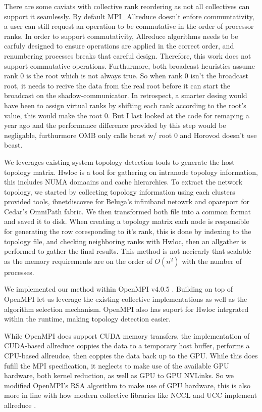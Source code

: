 There are some caviats with collective rank reordering as not all collectives can support it seamlessly.
By default MPI\_Allreduce doesn't enfore communtativity, a user can still request an operation to be commutative in the order of processor ranks. 
In order to support commutativity, Allreduce algorithms needs to be carfuly designed to ensure operations are applied in the correct order, and renumbering processes breaks that careful design.
Therefore, this work does not support commutative operations.
Furthurmore, both broadcast heuristics assume rank 0 is the root which is not always true. 
So when rank 0 isn't the broadcast root, it needs to recive the data from the real root before it can start the broadcast on the shadow-communicator.
In retrospect, a smarter desing would have been to assign virtual ranks by shifting each rank according to the root's value, this would make the root 0.
But I last looked at the code for remaping a year ago and the performance difference provided by this step would be negligable, furthurmore OMB only calls bcast w/ root 0 and Horovod doesn't use bcast.

We leverages existing system topology detection tools to generate the host topology matrix.
Hwloc \cite{Broquedis2010hwloc} is a tool for gathering on intranode topology information, this includes NUMA domaains and cache hierarchies.
To extract the network topology, we started by collecting topology information using each clusters provided tools, ibnetdiscovee for Beluga's infiniband netowrk and opareport for Cedar's OmniPath fabric.
We then transformed both file into a common format and saved it to disk.
When creating a topology matrix each node is responsible for generating the row coresponding to it's rank, this is done by indexing to the topology file, and checking neighboring ranks with Hwloc, then an allgather is performed to gather the final results.
This method is not necicarly that scalable as the memory requirements are on the order of $O(n^2)$ with the number of processes.

We implemented our method within OpenMPI v4.0.5 \cite{gabriel2004OpenMPI}.
Building on top of OpenMPI let us leverage the existing collective implementations as well as the algorithm selection mechanism.
OpenMPI also has suport for Hwloc intrgrated within the runtime, making topology detection easier.

While OpenMPI does support CUDA memory transfers, the implementation of CUDA-based allreduce coppies the data to a temporary host buffer, performs a CPU-based allreudce, then coppies the data back up to the GPU.
While this does fufill the MPI specification, it neglects to make use of the available GPU hardware, both kernel reduction, as well as GPU to GPU NVLinks.
So we modified OpenMPI's RSA algorithm to make use of GPU hardware, this is also more in line with how modern collective libraries like NCCL and UCC implement allreduce \cite{UCC, NCCL}.

